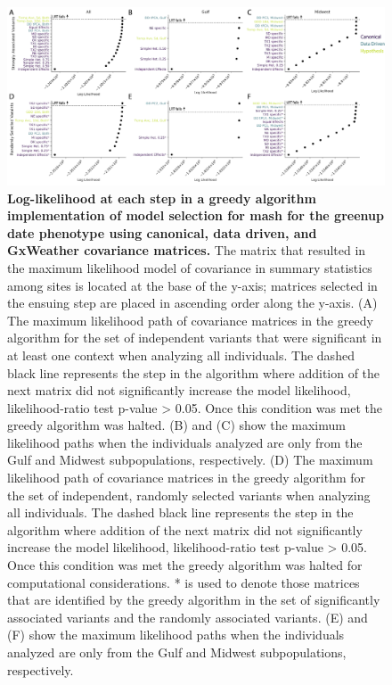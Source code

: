 \documentclass[
  letterpaper,
  DIV=11,
  numbers=noendperiod]{scrartcl}
\begin{document}
\begin{figure}[H]

{\centering \includegraphics{images/RR_Figure3.png}

}

\caption{\textbf{Log-likelihood at each step in a greedy algorithm
implementation of model selection for mash for the greenup date
phenotype using canonical, data driven, and GxWeather covariance
matrices.} The matrix that resulted in the maximum likelihood model of
covariance in summary statistics among sites is located at the base of
the y-axis; matrices selected in the ensuing step are placed in
ascending order along the y-axis. (A) The maximum likelihood path of
covariance matrices in the greedy algorithm for the set of independent
variants that were significant in at least one context when analyzing
all individuals. The dashed black line represents the step in the
algorithm where addition of the next matrix did not significantly
increase the model likelihood, likelihood-ratio test p-value
\textgreater{} 0.05. Once this condition was met the greedy algorithm
was halted. (B) and (C) show the maximum likelihood paths when the
individuals analyzed are only from the Gulf and Midwest subpopulations,
respectively. (D) The maximum likelihood path of covariance matrices in
the greedy algorithm for the set of independent, randomly selected
variants when analyzing all individuals. The dashed black line
represents the step in the algorithm where addition of the next matrix
did not significantly increase the model likelihood, likelihood-ratio
test p-value \textgreater{} 0.05. Once this condition was met the greedy
algorithm was halted for computational considerations. * is used to
denote those matrices that are identified by the greedy algorithm in the
set of significantly associated variants and the randomly associated
variants. (E) and (F) show the maximum likelihood paths when the
individuals analyzed are only from the Gulf and Midwest subpopulations,
respectively.}

\end{figure}%
\end{document}

